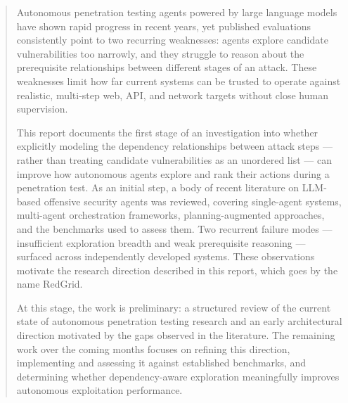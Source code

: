 \begin{abstract}

	\hspace{1cm} Autonomous penetration testing agents powered by large language models have shown rapid progress in recent years, yet published evaluations consistently point to two recurring weaknesses: agents explore candidate vulnerabilities too narrowly, and they struggle to reason about the prerequisite relationships between different stages of an attack. These weaknesses limit how far current systems can be trusted to operate against realistic, multi-step web, API, and network targets without close human supervision.

	\vspace{0.3cm}
	\hspace{1cm} This report documents the first stage of an investigation into whether explicitly modeling the dependency relationships between attack steps --- rather than treating candidate vulnerabilities as an unordered list --- can improve how autonomous agents explore and rank their actions during a penetration test. As an initial step, a body of recent literature on LLM-based offensive security agents was reviewed, covering single-agent systems, multi-agent orchestration frameworks, planning-augmented approaches, and the benchmarks used to assess them. Two recurrent failure modes --- insufficient exploration breadth and weak prerequisite reasoning --- surfaced across independently developed systems. These observations motivate the research direction described in this report, which goes by the name RedGrid.

	\vspace{0.3cm}
	\hspace{1cm} At this stage, the work is preliminary: a structured review of the current state of autonomous penetration testing research and an early architectural direction motivated by the gaps observed in the literature. The remaining work over the coming months focuses on refining this direction, implementing and assessing it against established benchmarks, and determining whether dependency-aware exploration meaningfully improves autonomous exploitation performance.

\end{abstract}

\clearpage
{}
